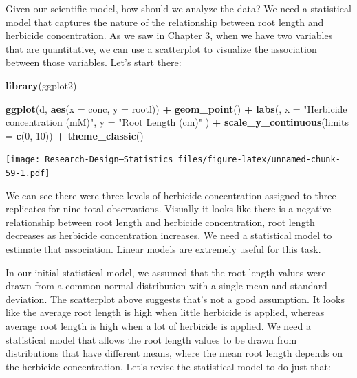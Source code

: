 \documentclass[
]{book}
\newenvironment{Shaded}{\begin{snugshade}}{\end{snugshade}}
\newcommand{\AttributeTok}[1]{\textcolor[rgb]{0.13,0.29,0.53}{#1}}
\newcommand{\DecValTok}[1]{\textcolor[rgb]{0.00,0.00,0.81}{#1}}
\newcommand{\FunctionTok}[1]{\textcolor[rgb]{0.13,0.29,0.53}{\textbf{#1}}}
\newcommand{\NormalTok}[1]{#1}
\newcommand{\SpecialCharTok}[1]{\textcolor[rgb]{0.81,0.36,0.00}{\textbf{#1}}}
\newcommand{\StringTok}[1]{\textcolor[rgb]{0.31,0.60,0.02}{#1}}
\begin{document}
Given our scientific model, how should we analyze the data? We need a statistical model that captures the nature of the relationship between root length and herbicide concentration. As we saw in Chapter 3, when we have two variables that are quantitative, we can use a scatterplot to visualize the association between those variables. Let's start there:

\begin{Shaded}
\begin{Highlighting}[]
\FunctionTok{library}\NormalTok{(ggplot2)}

\FunctionTok{ggplot}\NormalTok{(d, }\FunctionTok{aes}\NormalTok{(}\AttributeTok{x =}\NormalTok{ conc, }\AttributeTok{y =}\NormalTok{ rootl)) }\SpecialCharTok{+}
  \FunctionTok{geom\_point}\NormalTok{() }\SpecialCharTok{+}
  \FunctionTok{labs}\NormalTok{(,}
    \AttributeTok{x =} \StringTok{"Herbicide concentration (mM)"}\NormalTok{,}
    \AttributeTok{y =} \StringTok{"Root Length (cm)"}
\NormalTok{  ) }\SpecialCharTok{+}
  \FunctionTok{scale\_y\_continuous}\NormalTok{(}\AttributeTok{limits =} \FunctionTok{c}\NormalTok{(}\DecValTok{0}\NormalTok{, }\DecValTok{10}\NormalTok{)) }\SpecialCharTok{+} 
  \FunctionTok{theme\_classic}\NormalTok{()}
\end{Highlighting}
\end{Shaded}

\texttt{[image: Research-Design---Statistics\_files/figure-latex/unnamed-chunk-59-1.pdf]}

We can see there were three levels of herbicide concentration assigned to three replicates for nine total observations. Visually it looks like there is a negative relationship between root length and herbicide concentration, root length decreases as herbicide concentration increases. We need a statistical model to estimate that association. Linear models are extremely useful for this task.

In our initial statistical model, we assumed that the root length values were drawn from a common normal distribution with a single mean and standard deviation. The scatterplot above suggests that's not a good assumption. It looks like the average root length is high when little herbicide is applied, whereas average root length is high when a lot of herbicide is applied. We need a statistical model that allows the root length values to be drawn from distributions that have different means, where the mean root length depends on the herbicide concentration. Let's revise the statistical model to do just that:
\end{document}
